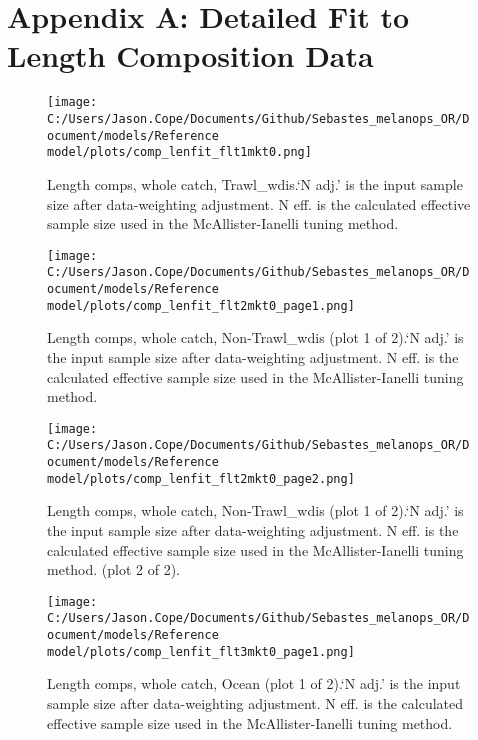 \documentclass[11pt,
  english,
  letterpaper,
]{article}
\begin{document}
\newpage

\clearpage

\hypertarget{app-a}{%
\section{Appendix A: Detailed Fit to Length Composition Data}\label{app-a}}

\begin{figure}
\centering
\texttt{[image: C:/Users/Jason.Cope/Documents/Github/Sebastes\_melanops\_OR/Document/models/Reference model/plots/comp\_lenfit\_flt1mkt0.png]}
\caption{Length comps, whole catch, Trawl\_wdis.`N adj.' is the input sample size after data-weighting adjustment. N eff. is the calculated effective sample size used in the McAllister-Ianelli tuning method.\label{fig:comp_lenfit_flt1mkt0}}
\end{figure}

\begin{figure}
\centering
\texttt{[image: C:/Users/Jason.Cope/Documents/Github/Sebastes\_melanops\_OR/Document/models/Reference model/plots/comp\_lenfit\_flt2mkt0\_page1.png]}
\caption{Length comps, whole catch, Non-Trawl\_wdis (plot 1 of 2).`N adj.' is the input sample size after data-weighting adjustment. N eff. is the calculated effective sample size used in the McAllister-Ianelli tuning method.\label{fig:comp_lenfit_flt2mkt0_page1}}
\end{figure}

\begin{figure}
\centering
\texttt{[image: C:/Users/Jason.Cope/Documents/Github/Sebastes\_melanops\_OR/Document/models/Reference model/plots/comp\_lenfit\_flt2mkt0\_page2.png]}
\caption{Length comps, whole catch, Non-Trawl\_wdis (plot 1 of 2).`N adj.' is the input sample size after data-weighting adjustment. N eff. is the calculated effective sample size used in the McAllister-Ianelli tuning method. (plot 2 of 2).\label{fig:comp_lenfit_flt2mkt0_page2}}
\end{figure}

\begin{figure}
\centering
\texttt{[image: C:/Users/Jason.Cope/Documents/Github/Sebastes\_melanops\_OR/Document/models/Reference model/plots/comp\_lenfit\_flt3mkt0\_page1.png]}
\caption{Length comps, whole catch, Ocean (plot 1 of 2).`N adj.' is the input sample size after data-weighting adjustment. N eff. is the calculated effective sample size used in the McAllister-Ianelli tuning method.\label{fig:comp_lenfit_flt3mkt0_page1}}
\end{figure}
\end{document}
